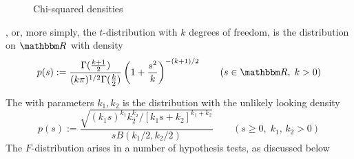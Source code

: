 \begin{frame}

    \begin{figure}
   \begin{center}
    \caption{\label{f:chisq_densities} Chi-squared densities}
   \end{center}
    \end{figure}
    
\end{frame}

\begin{frame}

    \vspace{2em}
    \Eg
    , or, more simply,
    the $t$-distribution with $k$ degrees of freedom, is the distribution on $\RR$
    with density
    \begin{equation*}
        p(s) := \frac{\Gamma(\frac{k+1}{2})}{(k\pi)^{1/2} \Gamma(\frac{k}{2})}
        \left( 1 + \frac{s^2}{k} \right)^{-(k+1)/2}
        \qquad (s \in \RR,\; k > 0)
    \end{equation*}
    
\end{frame}

\begin{frame}

    \vspace{2em}
    \Eg
    The  with parameters $k_1, k_2$ is the distribution
    with the unlikely looking density
    \begin{equation*}
        p(s) 
        := \frac{\sqrt{(k_1 s)^{k_1}k_2^{k_2}/[k_1 s + k_2]^{k_1 + k_2}}}
            {s B(k_1/2, k_2/2)}
        \qquad (s \geq 0, \; k_1, \, k_2 > 0)
    \end{equation*}
    The $F$-distribution arises in a number of hypothesis tests, as discussed below
    
\end{frame}

